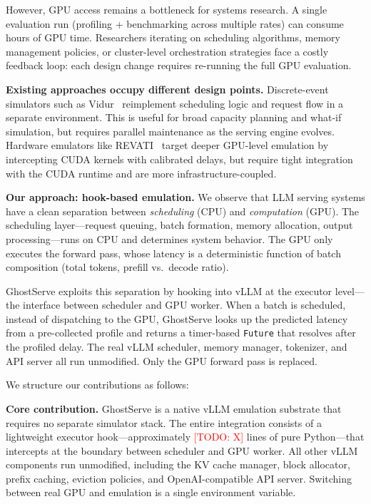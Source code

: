 \documentclass[conference]{IEEEtran}
\newcommand{\sysname}{GhostServe}
\newcommand{\todo}[1]{\textcolor{red}{[TODO: #1]}}
\begin{document}
However, GPU access remains a bottleneck for systems research. A single evaluation run (profiling + benchmarking across multiple rates) can consume hours of GPU time. Researchers iterating on scheduling algorithms, memory management policies, or cluster-level orchestration strategies face a costly feedback loop: each design change requires re-running the full GPU evaluation.

\textbf{Existing approaches occupy different design points.} Discrete-event simulators such as Vidur~\cite{agrawal2024vidur} reimplement scheduling logic and request flow in a separate environment. This is useful for broad capacity planning and what-if simulation, but requires parallel maintenance as the serving engine evolves. Hardware emulators like REVATI~\cite{agrawal2024revati} target deeper GPU-level emulation by intercepting CUDA kernels with calibrated delays, but require tight integration with the CUDA runtime and are more infrastructure-coupled.

\textbf{Our approach: hook-based emulation.} We observe that LLM serving systems have a clean separation between \emph{scheduling} (CPU) and \emph{computation} (GPU). The scheduling layer---request queuing, batch formation, memory allocation, output processing---runs on CPU and determines system behavior. The GPU only executes the forward pass, whose latency is a deterministic function of batch composition (total tokens, prefill vs.\ decode ratio).

\sysname{} exploits this separation by hooking into vLLM at the executor level---the interface between scheduler and GPU worker. When a batch is scheduled, instead of dispatching to the GPU, \sysname{} looks up the predicted latency from a pre-collected profile and returns a timer-based \texttt{Future} that resolves after the profiled delay. The real vLLM scheduler, memory manager, tokenizer, and API server all run unmodified. Only the GPU forward pass is replaced.

We structure our contributions as follows:

\textbf{Core contribution.} \sysname{} is a native vLLM emulation substrate that requires no separate simulator stack. The entire integration consists of a lightweight executor hook---approximately \todo{X} lines of pure Python---that intercepts at the boundary between scheduler and GPU worker. All other vLLM components run unmodified, including the KV cache manager, block allocator, prefix caching, eviction policies, and OpenAI-compatible API server. Switching between real GPU and emulation is a single environment variable.
\end{document}
